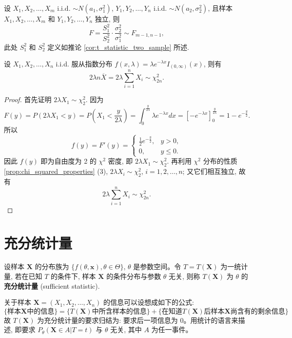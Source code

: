 \begin{corollary} \label{cor:f_statistic_two_sample}
设 $X_1, X_2, \ldots, X_m$ i.i.d. $\sim N(a_1,\sigma_1^2)$, $Y_1, Y_2, \ldots, Y_n$ i.i.d. $\sim N(a_2,\sigma_2^2)$, 且样本 $X_1, X_2, \ldots, X_m$ 和 $Y_1, Y_2, \ldots, Y_n$ 独立, 则
\[
F = \frac{S_1^2}{S_2^2} \cdot \frac{\sigma_2^2}{\sigma_1^2} \sim F_{m-1,n-1},
\]
此处 $S_1^2$ 和 $S_2^2$ 定义如推论 \ref{cor:t_statistic_two_sample} 所述.
\end{corollary}
\begin{corollary}[服从指数分布的随机变量的线性函数的分布] \label{cor:sum_of_exponentials_to_chi_squared}
设 $X_1, X_2, \ldots, X_n$ i.i.d. 服从指数分布 $f(x, \lambda) = \lambda e^{-\lambda x}I_{(0,\infty)}(x)$, 则有
\[
2\lambda n \overline{X} = 2\lambda \sum_{i=1}^n X_i \sim \chi_{2n}^2.
\]
\end{corollary}
\begin{proof}
首先证明 $2\lambda X_1 \sim \chi_2^2$. 因为
\[
F(y) = P(2\lambda X_1 < y) = P\left(X_1 < \frac{y}{2\lambda}\right) = \int_0^{\frac{y}{2\lambda}} \lambda e^{-\lambda x}dx = \left[-e^{-\lambda x}\right]_0^{\frac{y}{2\lambda}} = 1 - e^{-\frac{y}{2}}.
\]
所以
\[
f(y) = F'(y) =
\begin{cases}
\frac{1}{2}e^{-\frac{y}{2}}, & y>0, \\
0, & y\le 0.
\end{cases}
\]
因此 $f(y)$ 即为自由度为 2 的 $\chi^2$ 密度, 即 $2\lambda X_1 \sim \chi_2^2$.
再利用 $\chi^2$ 分布的性质 \ref{prop:chi_squared_properties} (3), $2\lambda X_i \sim \chi_2^2$, $i=1,2,\ldots,n$; 又它们相互独立, 故有
\[
2\lambda \sum_{i=1}^n X_i \sim \chi_{2n}^2.
\]
\end{proof}

\section{充分统计量}\label{sec:充分统计量}
\begin{definition}[充分统计量] \label{def:sufficient_statistic}
设样本 $\boldsymbol{X}$ 的分布族为 $\{f(\theta,\boldsymbol{x}), \theta \in \Theta\}$, $\theta$ 是参数空间。令 $T=T(\boldsymbol{X})$ 为一统计量, 若在已知 $T$ 的条件下, 样本 $\boldsymbol{X}$ 的条件分布与参数 $\theta$ 无关, 则称 $T(\boldsymbol{X})$ 为 $\theta$ 的\textbf{充分统计量} (sufficient statistic).
\end{definition}
\begin{remark}
    关于样本 $\boldsymbol{X} = (X_1, X_2, \ldots, X_n)$ 的信息可以设想成如下的公式:
\[
\{\text{样本}\boldsymbol{X}\text{中的信息}\} = \{T(\boldsymbol{X})\text{中所含样本的信息}\} + \{\text{在知道}T(\boldsymbol{X})\text{后样本}\boldsymbol{X}\text{尚含有的剩余信息}\}
\]
故 $T(\boldsymbol{X})$ 为充分统计量的要求归结为: 要求后一项信息为 $0$。用统计的语言来描述, 即要求 $P_\theta(\boldsymbol{X}\in A|T=t)$ 与 $\theta$ 无关, 其中 $A$ 为任一事件。
\end{remark}

